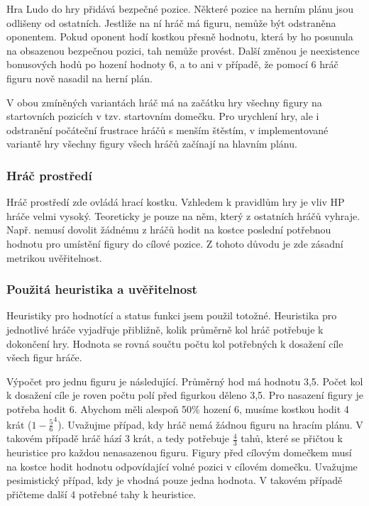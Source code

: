 Hra Ludo do hry přidává bezpečné pozice. Některé pozice na herním plánu jsou odlišeny od ostatních. Jestliže na ní hráč má figuru, nemůže být odstraněna oponentem. Pokud oponent hodí kostkou přesně hodnotu, která by ho posunula na obsazenou bezpečnou pozici, tah nemůže provést. Další změnou je neexistence bonusových hodů po hození hodnoty 6, a to ani v případě, že pomocí 6 hráč figuru nově nasadil na herní plán.

V obou zmíněných variantách hráč má na začátku hry všechny figury na startovních pozicích v tzv. startovním domečku. Pro urychlení hry, ale i odstranění počáteční frustrace hráčů s menším štěstím, v implementované variantě hry všechny figury všech hráčů začínají na hlavním plánu.

\subsubsection{Hráč prostředí}

Hráč prostředí zde ovládá hrací kostku. Vzhledem k pravidlům hry je vliv HP hráče velmi vysoký. Teoreticky je pouze na něm, který z ostatních hráčů vyhraje. Např. nemusí dovolit žádnému z hráčů hodit na kostce poslední potřebnou hodnotu pro umístění figury do cílové pozice. Z tohoto důvodu je zde zásadní metrikou uvěřitelnost.

\subsubsection{Použitá heuristika a uvěřitelnost}

Heuristiky pro hodnotící a status funkci jsem použil totožné. Heuristika pro jednotlivé hráče vyjadřuje přibližně, kolik průměrně kol hráč potřebuje k dokončení hry. Hodnota se rovná součtu počtu kol potřebných k dosažení cíle všech figur hráče. 

Výpočet pro jednu figuru je následující. Průměrný hod má hodnotu 3,5. Počet kol k dosažení cíle je roven počtu polí před figurkou děleno 3,5. Pro nasazení figury je potřeba hodit 6. Abychom měli alespoň 50\% hození 6, musíme kostkou hodit 4 krát ($1-\frac{5}{6}^4$). Uvažujme případ, kdy hráč nemá žádnou figuru na hracím plánu. V takovém případě hráč hází 3 krát, a tedy potřebuje $\frac{4}{3}$ tahů, které se přičtou k heuristice pro každou nenasazenou figuru. Figury před cílovým domečkem musí na kostce hodit hodnotu odpovídající volné pozici v cílovém domečku. Uvažujme pesimistický případ, kdy je vhodná pouze jedna hodnota. V takovém případě přičteme další 4 potřebné tahy k heuristice.

